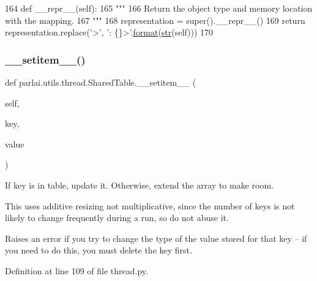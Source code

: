 \begin{DoxyCode}
164     \textcolor{keyword}{def }\_\_repr\_\_(self):
165         \textcolor{stringliteral}{"""}
166 \textcolor{stringliteral}{        Return the object type and memory location with the mapping.}
167 \textcolor{stringliteral}{        """}
168         representation = super().\_\_repr\_\_()
169         \textcolor{keywordflow}{return} representation.replace(\textcolor{stringliteral}{'>'}, \textcolor{stringliteral}{': \{\}>'}.\hyperlink{namespaceparlai_1_1chat__service_1_1services_1_1messenger_1_1shared__utils_a32e2e2022b824fbaf80c747160b52a76}{format}(\hyperlink{namespacegenerate__task__READMEs_a5b88452ffb87b78c8c85ececebafc09f}{str}(self)))
170 
\end{DoxyCode}
\mbox{\label{classparlai_1_1utils_1_1thread_1_1SharedTable_a43bc2c55c2125ce9c4848933fadeef5c}} 
\subsubsection{\texorpdfstring{\+\_\+\+\_\+setitem\+\_\+\+\_\+()}{\_\_setitem\_\_()}}
{\footnotesize\ttfamily def parlai.\+utils.\+thread.\+Shared\+Table.\+\_\+\+\_\+setitem\+\_\+\+\_\+ (\begin{DoxyParamCaption}\item[{}]{self,  }\item[{}]{key,  }\item[{}]{value }\end{DoxyParamCaption})}

\begin{DoxyVerb}If key is in table, update it. Otherwise, extend the array to make room.

This uses additive resizing not multiplicative, since the number
of keys is not likely to change frequently during a run, so do not
abuse it.

Raises an error if you try to change the type of the value stored for
that key -- if you need to do this, you must delete the key first.
\end{DoxyVerb}
 

Definition at line 109 of file thread.\+py.


